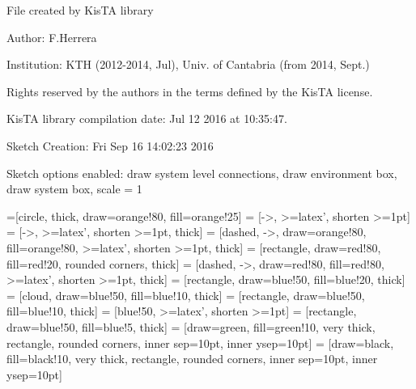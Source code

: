 \documentclass[a4paper,10pt]{article}
\begin{document}
File created by KisTA library

Author: F.Herrera

Institution: KTH (2012-2014, Jul), Univ. of Cantabria (from 2014, Sept.)

Rights reserved by the authors in the terms defined by the KisTA license.

KisTA library compilation date: Jul 12 2016 at 10:35:47.



Sketch Creation: Fri Sep 16 14:02:23 2016


Sketch options enabled:
draw system level connections, draw environment box, draw system box, scale = 1
\hfill


=[circle, thick, draw=orange!80, fill=orange!25]
 = [->, >=latex', shorten >=1pt]
 = [->, >=latex', shorten >=1pt, thick]
 = [dashed, ->, draw=orange!80, fill=orange!80, >=latex', shorten >=1pt, thick]
 = [rectangle, draw=red!80, fill=red!20, rounded corners, thick]
 = [dashed, ->, draw=red!80, fill=red!80, >=latex', shorten >=1pt, thick]
 = [rectangle, draw=blue!50, fill=blue!20, thick]
 = [cloud, draw=blue!50, fill=blue!10, thick]
 = [rectangle, draw=blue!50, fill=blue!10, thick]
 = [blue!50, >=latex', shorten >=1pt]
 = [rectangle, draw=blue!50,  fill=blue!5, thick]
 = [draw=green, fill=green!10, very thick, rectangle, rounded corners, inner sep=10pt, inner ysep=10pt]
 = [draw=black, fill=black!10, very thick, rectangle, rounded corners, inner sep=10pt, inner ysep=10pt]
\end{document}
